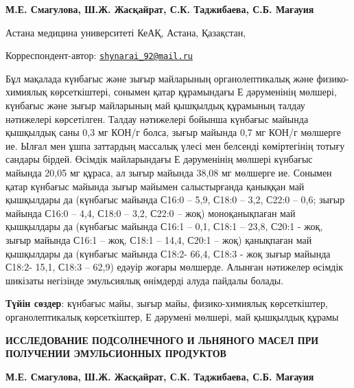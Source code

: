 
\begin{articleheader}

{\bfseries
М.Е. Смагулова,
Ш.Ж. Жасқайрат\textsuperscript{\envelope },
С.К. Таджибаева,
С.Б. Мағауия
}
\end{articleheader}

\begin{affiliation}
Астана медицина университеті КеАҚ, Астана, Қазақстан,

\raggedright \textsuperscript{\envelope }Корреспондент-автор: \href{mailto:shynarai\_92@mail.ru}{\nolinkurl{shynarai\_92@mail.ru}}
\end{affiliation}

Бұл мақалада күнбағыс және зығыр майларының органолептикалық және
физико-химиялық көрсеткіштері, сонымен қатар құрамындағы Е дәруменінің
мөлшері, күнбағыс және зығыр майларының май қышқылдық құрамының талдау
нәтижелері көрсетілген. Талдау нәтижелері бойынша күнбағыс майында
қышқылдық саны 0,3 мг КОН/г болса, зығыр майында 0,7 мг КОН/г мөлшерге
ие. Ылғал мен ұшпа заттардың массалық үлесі мен белсенді көміртегінің
тотығу сандары бірдей. Өсімдік майларындағы Е дәруменінің мөлшері
күнбағыс майында 20,05 мг құраса, ал зығыр майында 38,08 мг мөлшерге ие.
Сонымен қатар күнбағыс майында зығыр майымен салыстырғанда қаныққан май
қышқылдары да (күнбағыс майында С16:0 -- 5,9, С18:0 -- 3,2, С22:0 --
0,6; зығыр майында С16:0 -- 4,4, С18:0 -- 3,2, С22:0 -- жоқ)
моноқанықпаған май қышқылдары да (күнбағыс майында С16:1 -- 0,1, С18:1
-- 23,8, С20:1 - жоқ, зығыр майында С16:1 -- жоқ, С18:1 -- 14,4, С20:1
-- жоқ) қанықпаған май қышқылдары да (күнбағыс майында С18:2- 66,4,
С18:3 - жоқ зығыр майында С18:2- 15,1, С18:3 -- 62,9) едәуір жоғары
мөлшерде. Алынған нәтижелер өсімдік шикізаты негізінде эмульсиялық
өнімдерді алуда пайдалы болады.

{\bfseries Түйін сөздер}: күнбағыс майы, зығыр майы, физико-химиялық
көрсеткіштер, органолептикалық көрсеткіштер, Е дәрумені мөлшері, май
қышқылдық құрамы

\begin{articleheader}
{\bfseries ИССЛЕДОВАНИЕ ПОДСОЛНЕЧНОГО И ЛЬНЯНОГО МАСЕЛ ПРИ ПОЛУЧЕНИИ
ЭМУЛЬСИОННЫХ ПРОДУКТОВ}

{\bfseries
М.Е. Смагулова,
Ш.Ж. Жасқайрат\textsuperscript{\envelope },
С.К. Таджибаева,
С.Б. Мағауия
}
\end{articleheader}

